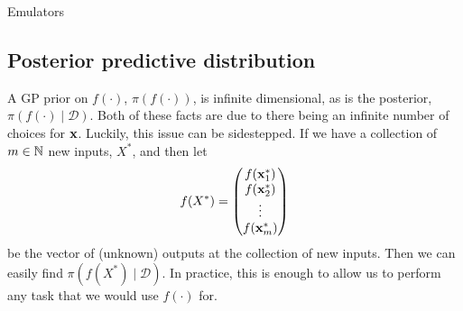 \begin{chapter}{Emulators \label{Ch:Emulators}}
\subsection{Posterior predictive distribution}
A GP prior on $f(\cdot)$, $\pi(f(\cdot))$, is infinite dimensional, as is the posterior, $\pi(f(\cdot) \mid \mathcal{D})$. Both of these facts are due to there being an infinite number of choices for $\mathbf{x}$. Luckily, this issue can be sidestepped. If we have a collection of $m \in \mathbb{N}$ new inputs, $X^{*}$, and then let
\begin{equation}
  f(X^{*}) = \begin{pmatrix}
              f(\mathbf{x}^{*}_1) \\ f(\mathbf{x}^{*}_2) \\ \vdots \\ f(\mathbf{x}^{*}_m)
             \end{pmatrix}
\end{equation}
be the vector of (unknown) outputs at the collection of new inputs. Then we can easily find $\pi(f(X^*) \mid \mathcal{D})$. In practice, this is enough to allow us to perform any task that we would use $f(\cdot)$ for.


\end{chapter}
